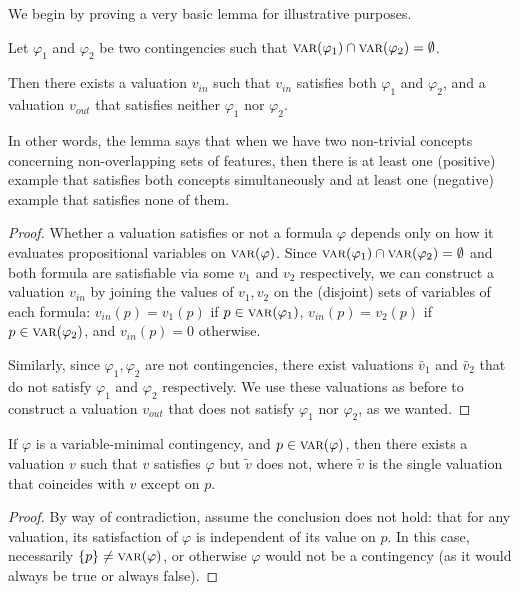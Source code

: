 \begin{appendices}
We begin by proving a very basic lemma for illustrative purposes. 
\begin{lemma}\label{lemma:InterseccionUnionConceptos}

Let $\varphi_1$ and $\varphi_2$ be two contingencies such that $\textsc{var}(\varphi_1) \cap  \textsc{var}(\varphi_2) = \emptyset$.


Then there exists a valuation $v_{in}$ such that $v_{in}$ satisfies both $\varphi_1$ and $\varphi_2$, and a valuation $v_{out}$ that satisfies neither $\varphi_1$ nor $\varphi_2$.
\end{lemma}
In other words, the lemma says that when we have two non-trivial concepts concerning non-overlapping sets of features, then there is at least one (positive) example that satisfies both concepts simultaneously and at least one (negative) example that satisfies none of them. 

\begin{proof}
Whether a valuation satisfies or not a formula $\varphi$ depends only on how it evaluates propositional variables on $\textsc{var}(\varphi)$. Since $\textsc{var}(\varphi_1) \cap  \textsc{var}(\varphi_2) = \emptyset$ and both formula are satisfiable via some $v_1$ and $v_2$ respectively, we can construct a valuation $v_{in}$ by joining the values of $v_1, v_2$ on the (disjoint) sets of variables of each formula: $v_{in}(p) = v_1(p)$ if $p \in \textsc{var}(\varphi_1)$,  $v_{in}(p) = v_2(p)$ if $p \in \textsc{var}(\varphi_2)$, and $v_{in}(p) = 0$ otherwise. 

Similarly, since $\varphi_1, \varphi_2$ are not contingencies, there exist valuations $\bar{v}_1$ and $\bar{v}_2$ that do not satisfy $\varphi_1$ and $\varphi_2$ respectively. We use these valuations as before to construct a valuation $v_{out}$ that does not satisfy $\varphi_1$ nor $\varphi_2$, as we wanted.
\end{proof}


\begin{lemma} \label{lemma:variableMinimalProp}
If $\varphi$ is a variable-minimal contingency, and $p \in \textsc{var}(\varphi)$, then there exists a valuation $v$ such that $v$ satisfies $\varphi$ but $\tilde{v}$ does not, where $\tilde{v}$ is the single valuation that coincides with $v$ except on $p$.
\end{lemma}
\begin{proof}


By way of contradiction, assume the conclusion does not hold: that for any valuation, its satisfaction of $\varphi$ is independent of its value on $p$. In this case, necessarily $\{p\} \neq \textsc{var}(\varphi)$, 
 or otherwise $\varphi$ would not be a contingency (as it would always be true or always false).


\end{proof}
\end{appendices}
